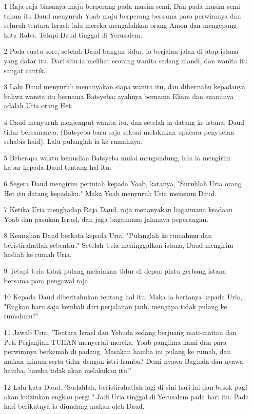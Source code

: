 \par 1 Raja-raja biasanya maju berperang pada musim semi. Dan pada musim semi tahun itu Daud menyuruh Yoab maju berperang bersama para perwiranya dan seluruh tentara Israel; lalu mereka mengalahkan orang Amon dan mengepung kota Raba. Tetapi Daud tinggal di Yerusalem.
\par 2 Pada suatu sore, setelah Daud bangun tidur, ia berjalan-jalan di atap istana yang datar itu. Dari situ ia melihat seorang wanita sedang mandi, dan wanita itu sangat cantik.
\par 3 Lalu Daud menyuruh menanyakan siapa wanita itu, dan diberitahu kepadanya bahwa wanita itu bernama Batsyeba; ayahnya bernama Eliam dan suaminya adalah Uria orang Het.
\par 4 Daud menyuruh menjemput wanita itu, dan setelah ia datang ke istana, Daud tidur bersamanya. (Batsyeba baru saja selesai melakukan upacara penyucian sehabis haid). Lalu pulanglah ia ke rumahnya.
\par 5 Beberapa waktu kemudian Batsyeba mulai mengandung, lalu ia mengirim kabar kepada Daud tentang hal itu.
\par 6 Segera Daud mengirim perintah kepada Yoab, katanya, "Suruhlah Uria orang Het itu datang kepadaku." Maka Yoab menyuruh Uria menemui Daud.
\par 7 Ketika Uria menghadap Raja Daud, raja menanyakan bagaimana keadaan Yoab dan pasukan Israel, dan juga bagaimana jalannya peperangan.
\par 8 Kemudian Daud berkata kepada Uria, "Pulanglah ke rumahmu dan beristirahatlah sebentar." Setelah Uria meninggalkan istana, Daud mengirim hadiah ke rumah Uria.
\par 9 Tetapi Uria tidak pulang melainkan tidur di depan pintu gerbang istana bersama para pengawal raja.
\par 10 Kepada Daud diberitahukan tentang hal itu. Maka ia bertanya kepada Uria, "Engkau baru saja kembali dari perjalanan jauh, mengapa tidak pulang ke rumahmu?"
\par 11 Jawab Uria, "Tentara Israel dan Yehuda sedang berjuang mati-matian dan Peti Perjanjian TUHAN menyertai mereka; Yoab panglima kami dan para perwiranya berkemah di padang. Masakan hamba ini pulang ke rumah, dan makan minum serta tidur dengan istri hamba? Demi nyawa Baginda dan nyawa hamba, hamba tidak akan melakukan itu!"
\par 12 Lalu kata Daud, "Sudahlah, beristirahatlah lagi di sini hari ini dan besok pagi akan kuizinkan engkau pergi." Jadi Uria tinggal di Yerusalem pada hari itu. Pada hari berikutnya ia diundang makan oleh Daud.
